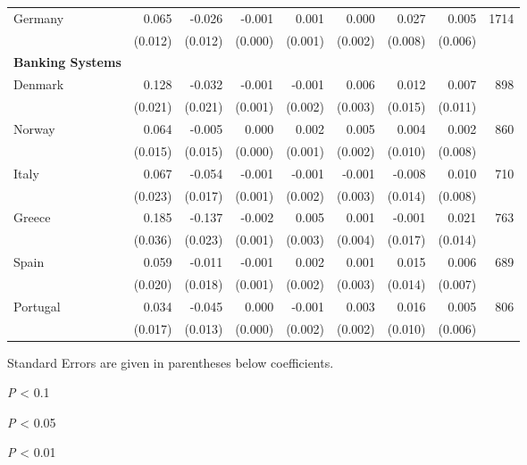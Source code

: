 \begin{table}
\begin{threeparttable}
\begin{tabularx}{8in}{X*{8}{d}}
Germany  &   0.065\sym{***}  & -0.026\sym{**}  &  -0.001\sym{***}  &    0.001  &  0.000  &   0.027\sym{***}  &  0.005  & 1714\\
 & (0.012) & (0.012) &  (0.000)  &  (0.001) & (0.002) &  (0.008) & (0.006) & \\
 \textbf{Banking Systems} & & & & & & & & \\
\midrule
Denmark  &   0.128\sym{***}  & -0.032  &  -0.001\sym{**}  &   -0.001  &  0.006\sym{**}  &   0.012\sym{**}  &  0.007  & 898\\
 & (0.021) & (0.021) &  (0.001)  &  (0.002) & (0.003) &  (0.015) & (0.011) & \\
Norway  &   0.064\sym{***}  & -0.005  &   0.000  &    0.002\sym{**}  &  0.005\sym{**}  &   0.004  &  0.002  & 860\\
 & (0.015) & (0.015) &  (0.000)  &  (0.001) & (0.002) &  (0.010) & (0.008) & \\
Italy  &   0.067\sym{***}  & -0.054\sym{***}  &  -0.001\sym{**}  &   -0.001  & -0.001  &  -0.008  &  0.010  & 710\\
 & (0.023) & (0.017) &  (0.001)  &  (0.002) & (0.003) &  (0.014) & (0.008) & \\
Greece  &   0.185\sym{***}  & -0.137\sym{***}  &  -0.002 \sym{***} &    0.005\sym{*}  &  0.001  &  -0.001  &  0.021  & 763\\
 & (0.036) & (0.023) &  (0.001)  &  (0.003) & (0.004) &  (0.017) & (0.014) & \\
Spain  &   0.059\sym{***}  & -0.011  &  -0.001  &    0.002  &  0.001  &   0.015  &  0.006  & 689\\
 & (0.020) & (0.018) &  (0.001)  &  (0.002) & (0.003) &  (0.014) & (0.007) & \\
Portugal  &   0.034\sym{**}  & -0.045\sym{***}  &   0.000  &   -0.001  &  0.003  &   0.016  &  0.005  & 806 \\
 & (0.017) & (0.013) &  (0.000)  &  (0.002) & (0.002) &  (0.010) & (0.006) & \\
 \bottomrule
\end{tabularx}
\begin{tablenotes}
\item \scriptsize{Standard Errors are given in parentheses below coefficients.}
\item \scriptsize{\sym{*} \emph{P} < 0.1}
\item \scriptsize{\sym{**} \emph{P} < 0.05}
\item \scriptsize{\sym{***} \emph{P} < 0.01}
\end{tablenotes}
\end{threeparttable}
\fontsize{10}{15}\selectfont
\end{table}